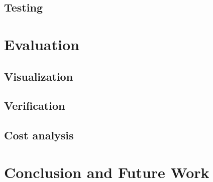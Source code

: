\documentclass[sigconf]{acmart}
\begin{document}
	\subsection{Testing} %
	
	\section{Evaluation}
	
	
	\subsection{Visualization} %
	\subsection{Verification} %
	\subsection{Cost analysis} %
	
	\section{Conclusion and Future Work} %
\end{document}
